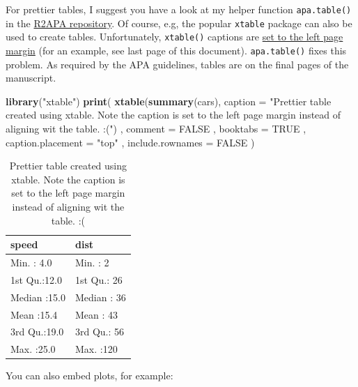 \documentclass[american,man]{apa6}
\newenvironment{Shaded}{\begin{snugshade}}{\end{snugshade}}
\newcommand{\KeywordTok}[1]{\textcolor[rgb]{0.13,0.29,0.53}{\textbf{{#1}}}}
\newcommand{\DataTypeTok}[1]{\textcolor[rgb]{0.13,0.29,0.53}{{#1}}}
\newcommand{\StringTok}[1]{\textcolor[rgb]{0.31,0.60,0.02}{{#1}}}
\newcommand{\OtherTok}[1]{\textcolor[rgb]{0.56,0.35,0.01}{{#1}}}
\newcommand{\NormalTok}[1]{{#1}}
\begin{document}
For prettier tables, I suggest you have a look at my helper function
\texttt{apa.table()} in the \href{https://github.com/crsh/r2apa}{R2APA
repository}. Of course, e.g, the popular \texttt{xtable} package can
also be used to create tables. Unfortunately, \texttt{xtable()} captions
are
\href{http://tex.stackexchange.com/questions/42209/centering-tables-in-document-class-apa6}{set
to the left page margin} (for an example, see last page of this
document). \texttt{apa.table()} fixes this problem. As required by the
APA guidelines, tables are on the final pages of the manuscript.

\begin{Shaded}
\begin{Highlighting}[]
\KeywordTok{library}\NormalTok{(}\StringTok{"xtable"}\NormalTok{)}
\KeywordTok{print}\NormalTok{(}
  \KeywordTok{xtable}\NormalTok{(}\KeywordTok{summary}\NormalTok{(cars), }\DataTypeTok{caption =} \StringTok{"Prettier table created using xtable.}
\StringTok{         Note the caption is set to the left page margin}
\StringTok{         instead of aligning wit the table. :("}\NormalTok{)}
  \NormalTok{, }\DataTypeTok{comment =} \OtherTok{FALSE}
  \NormalTok{, }\DataTypeTok{booktabs =} \OtherTok{TRUE}
  \NormalTok{, }\DataTypeTok{caption.placement =} \StringTok{"top"}
  \NormalTok{, }\DataTypeTok{include.rownames =} \OtherTok{FALSE}
\NormalTok{)}
\end{Highlighting}
\end{Shaded}

\begin{table}[ht]
\centering
\caption{Prettier table created using xtable.
         Note the caption is set to the left page margin
         instead of aligning wit the table. :(} 
\begin{tabular}{ll}
  \toprule
    speed &      dist \\ 
  \midrule
Min.   : 4.0   & Min.   :  2   \\ 
  1st Qu.:12.0   & 1st Qu.: 26   \\ 
  Median :15.0   & Median : 36   \\ 
  Mean   :15.4   & Mean   : 43   \\ 
  3rd Qu.:19.0   & 3rd Qu.: 56   \\ 
  Max.   :25.0   & Max.   :120   \\ 
   \bottomrule
\end{tabular}
\end{table}

You can also embed plots, for example:
\end{document}
